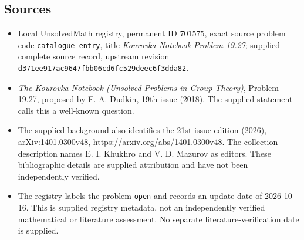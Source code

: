 \documentclass[11pt]{article}
\begin{document}
\subsection{Sources}
\begin{itemize}
\item Local UnsolvedMath registry, permanent ID \(701575\), exact source problem code \texttt{catalogue entry}, title \emph{Kourovka Notebook Problem 19.27}; supplied complete source record, upstream revision \texttt{d371ee917ac9647fbb06cd6fc529deec6f3dda82}.
\item \emph{The Kourovka Notebook (Unsolved Problems in Group Theory)}, Problem 19.27, proposed by F. A. Dudkin, 19th issue (2018). The supplied statement calls this a well-known question.
\item The supplied background also identifies the 21st issue edition (2026), arXiv:1401.0300v48, \url{https://arxiv.org/abs/1401.0300v48}. The collection description names E. I. Khukhro and V. D. Mazurov as editors. These bibliographic details are supplied attribution and have not been independently verified.
\item The registry labels the problem \texttt{open} and records an update date of 2026-10-16. This is supplied registry metadata, not an independently verified mathematical or literature assessment. No separate literature-verification date is supplied.
\end{itemize}
\end{document}
